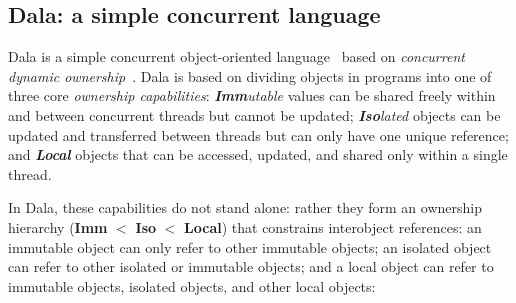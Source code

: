 \subsection{Dala: a simple concurrent language}
\label{DALAA}

Dala is a simple concurrent object-oriented language~\cite{Dalarna,dala-onward2021} based on \textit{concurrent dynamic  ownership}~\cite{dynamicOwn,dynamicAlias}.
Dala is based on dividing objects in programs
into one of three core \textit{ownership capabilities}:
%
%
\emph{\textbf{Imm}utable} values can be shared freely within and
between concurrent threads but cannot be updated;
\emph{\textbf{Iso}lated} objects can be updated and transferred
between threads but can only have one unique reference; and
\emph{\textbf{Local}} objects that can be accessed, updated, and
shared only within a single thread.

In Dala, these capabilities do not stand alone:
rather they form an ownership hierarchy (\textbf{Imm} $<$ \textbf{Iso}
$<$ \textbf{Local}) that constrains interobject references:
an immutable
object can only refer to other immutable objects; an isolated
object can refer to other isolated or immutable objects; and a local object
can refer to immutable objects, isolated objects, and other local
objects:

\begin{figure}[!h]
\centering
\end{figure}

